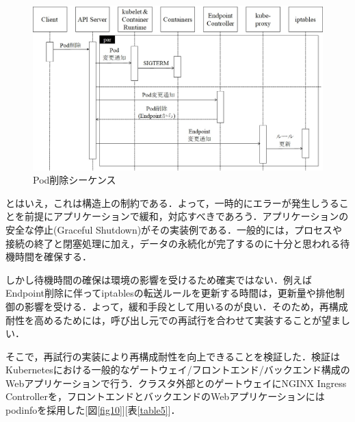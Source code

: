 \documentclass[12pt,a4j]{ujreport}
\begin{document}
\newpage
\begin{figure}[tb]
    \centerline{\includegraphics[clip,width=140mm]{images/del-pod-sequence.jpg}}
    \caption{Pod削除シーケンス}\label{fig9}
\end{figure}

とはいえ，これは構造上の制約である．よって，一時的にエラーが発生しうることを前提にアプリケーションで緩和，対応すべきであろう．アプリケーションの安全な停止(Graceful Shutdown)がその実装例である．一般的には，プロセスや接続の終了と閉塞処理に加え，データの永続化が完了するのに十分と思われる待機時間を確保する．

しかし待機時間の確保は環境の影響を受けるため確実ではない．例えばEndpoint削除に伴ってiptablesの転送ルールを更新する時間は，更新量や排他制御の影響を受ける．よって，緩和手段として用いるのが良い．そのため，再構成耐性を高めるためには，呼び出し元での再試行を合わせて実装することが望ましい．

そこで，再試行の実装により再構成耐性を向上できることを検証した．検証はKubernetesにおける一般的なゲートウェイ/フロントエンド/バックエンド構成のWebアプリケーションで行う．クラスタ外部とのゲートウェイにNGINX Ingress Controller\cite{ref30}を，フロントエンドとバックエンドのWebアプリケーションにはpodinfo\cite{ref31}を採用した[図\ref{fig10}][表\ref{table5}]．
\end{document}
